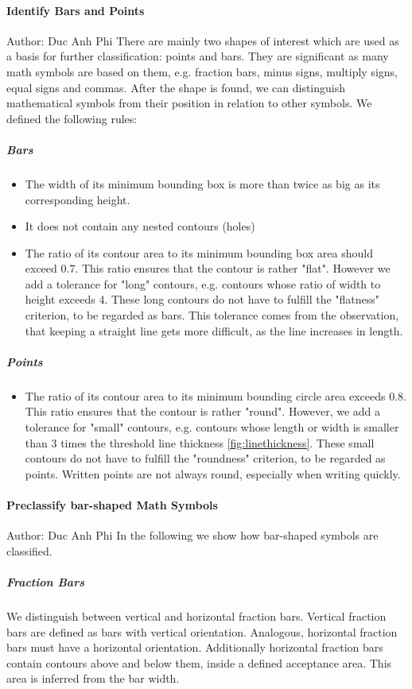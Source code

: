 \documentclass[12pt]{article}
\begin{document}
	\paragraph{Identify Bars and Points}
	\small{Author: Duc Anh Phi} \newline \newline
	There are mainly two shapes of interest which are used as a basis for further classification: points and bars. They are significant as many math symbols are based on them, e.g. fraction bars, minus signs, multiply signs, equal signs and commas. After the shape is found, we can distinguish mathematical symbols from their position in relation to other symbols. We defined the following rules:
	
	\subparagraph{Bars}\label{bars}
	\begin{itemize}
		\item The width of its minimum bounding box is more than twice as big as its corresponding height.
		\item It does not contain any nested contours (holes)
		\item The ratio of its contour area to its minimum bounding box area should exceed 0.7. This ratio ensures that the contour is rather "flat". However we add a tolerance for "long" contours, e.g. contours whose ratio of width to height exceeds 4. These long contours do not have to fulfill the "flatness" criterion, to be regarded as bars. This tolerance comes from the observation, that keeping a straight line gets more difficult, as the line increases in length. 
	\end{itemize}

	\subparagraph{Points}
	\begin{itemize}
		\item The ratio of its contour area to its minimum bounding circle area exceeds 0.8. This ratio ensures that the contour is rather "round". However, we add a tolerance for "small" contours, e.g. contours whose length or width is smaller than 3 times the threshold line thickness \ref{fig:linethickness}. These small contours do not have to fulfill the "roundness" criterion, to be regarded as points. Written points are not always round, especially when writing quickly.
	\end{itemize}

	\paragraph{Preclassify bar-shaped Math Symbols}
	\small{Author: Duc Anh Phi} \newline \newline
	In the following we show how bar-shaped symbols are classified.
	\subparagraph{Fraction Bars}\label{fractionbar}
	We distinguish between vertical and horizontal fraction bars.
	Vertical fraction bars are defined as bars with vertical orientation. Analogous, horizontal fraction bars must have a horizontal orientation. Additionally horizontal fraction bars contain contours above and below them, inside a defined acceptance area. This area is inferred from the bar width.
	
\end{document}
